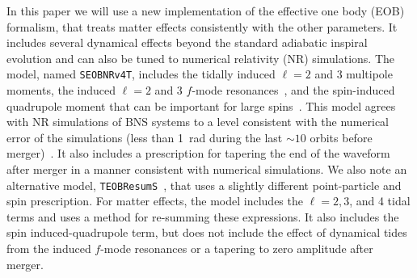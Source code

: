 \documentclass[prd,aps,letter,twocolumn,floatfix,notitlepage,nofootinbib]{revtex4-1}
\newcommand{\red}[1]{\textcolor{red}{#1}}
\begin{document}


In this paper we will use a new implementation of the effective one body (EOB) formalism, that treats matter effects consistently with the other parameters. It includes several dynamical effects beyond the standard adiabatic inspiral evolution and can also be tuned to numerical relativity (NR) simulations. The model, named \texttt{SEOBNRv4T}, includes the tidally induced $\ell=2$ and 3 multipole moments, the induced $\ell=2$ and 3 $f$-mode resonances~\cite{Hinderer:2016eia,Steinhoff:2016rfi}, and the spin-induced quadrupole moment that can be important for large spins~\cite{Poisson1998, HarryHinderer2018}. This model agrees with NR simulations of BNS systems to a level consistent with the numerical error of the simulations (less than 1~rad during the last $\sim 10$ orbits before merger)~\cite{DietrichHinderer2017, KiuchiKawaguchiKyutoku2017}. It also includes a prescription for tapering the end of the waveform after merger in a manner consistent with numerical simulations. We also note an alternative model, \texttt{TEOBResumS}~\cite{NagarBernuzziDelpozzo2018}, that uses a slightly different point-particle and spin prescription. For matter effects, the model includes the $\ell = 2, 3$, and 4 tidal terms and uses a method for re-summing these expressions. It also includes the spin induced-quadrupole term, but does not include the effect of dynamical tides from the induced $f$-mode resonances or a tapering to zero amplitude after merger. 
\end{document}
